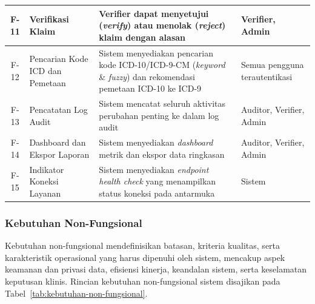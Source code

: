 \begin{small}
\begin{longtable}{|c|>{\raggedright\arraybackslash}p{2.5cm}|>{\raggedright\arraybackslash}p{6.2cm}|>{\raggedright\arraybackslash}p{2.8cm}|}
F-11 & Verifikasi Klaim & Verifier dapat menyetujui (\textit{verify}) atau menolak (\textit{reject}) klaim dengan alasan & Verifier, Admin \\ \hline
F-12 & Pencarian Kode ICD dan Pemetaan & Sistem menyediakan pencarian kode ICD-10/ICD-9-CM (\textit{keyword} \& \textit{fuzzy}) dan rekomendasi pemetaan ICD-10 ke ICD-9 & Semua pengguna terautentikasi \\ \hline
F-13 & Pencatatan Log Audit & Sistem mencatat seluruh aktivitas perubahan penting ke dalam log audit & Auditor, Verifier, Admin \\ \hline
F-14 & Dashboard dan Ekspor Laporan & Sistem menyediakan \textit{dashboard} metrik dan ekspor data ringkasan & Auditor, Verifier, Admin \\ \hline
F-15 & Indikator Koneksi Layanan & Sistem menyediakan \textit{endpoint health check} yang menampilkan status koneksi pada antarmuka & Sistem \\ \hline
\end{longtable}
\end{small}

\subsubsection{Kebutuhan Non-Fungsional}
Kebutuhan non-fungsional mendefinisikan batasan, kriteria kualitas, serta karakteristik operasional yang harus dipenuhi oleh sistem, mencakup aspek keamanan dan privasi data, efisiensi kinerja, keandalan sistem, serta keselamatan keputusan klinis. Rincian kebutuhan non-fungsional sistem disajikan pada Tabel~\ref{tab:kebutuhan-non-fungsional}.

